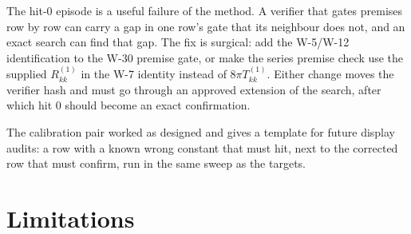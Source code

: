 \documentclass[11pt]{article}
\begin{document}
The hit-0 episode is a useful failure of the method. A verifier that gates premises row by row can carry a gap in one row's gate that its neighbour does not, and an exact search can find that gap. The fix is surgical: add the W-5/W-12 identification to the W-30 premise gate, or make the series premise check use the supplied $R^{(1)}_{kk}$ in the W-7 identity instead of $8\pi T^{(1)}_{kk}$. Either change moves the verifier hash and must go through an approved extension of the search, after which hit 0 should become an exact confirmation.

The calibration pair worked as designed and gives a template for future display audits: a row with a known wrong constant that must hit, next to the corrected row that must confirm, run in the same sweep as the targets.

\section{Limitations}
\end{document}
